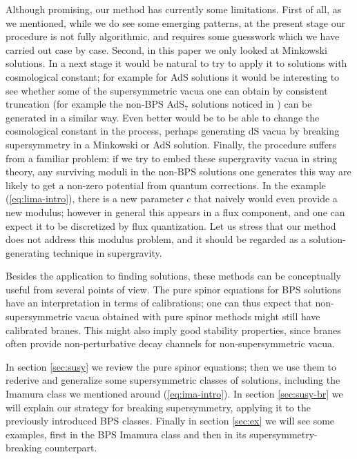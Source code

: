 \documentclass[12pt]{article}
\begin{document}
Although promising, our method has currently some limitations. First of all, as we mentioned, while we do see some emerging patterns, at the present stage our procedure is not fully algorithmic, and requires some guesswork which we have carried out case by case.  Second, in this paper we only looked at Minkowski solutions. In a next stage it would be natural to try to apply it to solutions with cosmological constant; for example for AdS solutions it would be interesting to see whether some of the supersymmetric vacua one can obtain by consistent truncation (for example the non-BPS AdS$_7$ solutions noticed in \cite{passias-rota-t})  can be generated in a similar way. Even better would be to be able to change the cosmological constant in the process, perhaps generating dS vacua by breaking supersymmetry in a Minkowski or AdS solution. Finally, the procedure suffers from a familiar problem: if we try to embed these supergravity vacua in string theory, any surviving moduli in the non-BPS solutions one generates this way are likely to get a non-zero potential from quantum corrections. In the example (\ref{eq:lima-intro}), there is a new parameter $c$ that naively would even provide a new modulus; however in general this appears in a flux component, and one can expect it to be discretized by flux quantization. Let us stress that our method does not address this modulus problem, and it should be regarded as a solution-generating technique in supergravity. 

Besides the application to finding solutions, these methods can be conceptually useful from several points of view. The pure spinor equations for BPS solutions have an interpretation in terms of calibrations; one can thus expect that non-supersymmetric vacua obtained with pure spinor methods might still have calibrated branes. This might also imply good stability properties, since branes often provide non-perturbative decay channels for non-supersymmetric vacua.

In section \ref{sec:susy} we review the pure spinor equations; then we use them to rederive and generalize some supersymmetric classes of solutions, including the Imamura class we mentioned around (\ref{eq:ima-intro}). In section \ref{sec:susy-br} we will explain our strategy for breaking supersymmetry, applying it to the previously introduced BPS classes. Finally in section \ref{sec:ex} we will see some examples, first in the BPS Imamura class and then in its supersymmetry-breaking counterpart.
\end{document}
